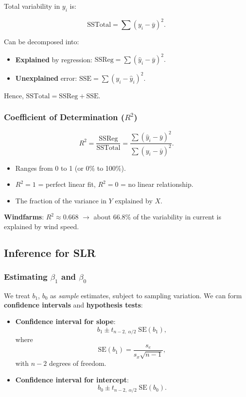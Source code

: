 \documentclass[10pt]{extarticle}
\begin{document}
Total variability in $y_i$ is:

\[
    \text{SSTotal} = \sum (y_i - \bar{y})^2.
\]

Can be decomposed into:
\begin{itemize}
    \item \textbf{Explained} by regression: $\text{SSReg} = \sum (\hat{y}_i - \bar{y})^2.$
    \item \textbf{Unexplained} error: $\text{SSE} = \sum (y_i - \hat{y}_i)^2.$
\end{itemize}

Hence, $\text{SSTotal} = \text{SSReg} + \text{SSE}.$

\subsubsection{Coefficient of Determination ($R^2$)}

\[
    R^2 = \frac{\text{SSReg}}{\text{SSTotal}} = \frac{\sum (\hat{y}_i - \bar{y})^2}{\sum (y_i - \bar{y})^2}.
\]

\begin{itemize}
    \item Ranges from 0 to 1 (or 0\% to 100\%).
    \item $R^2=1$ = perfect linear fit, $R^2=0$ = no linear relationship.
    \item The fraction of the variance in $Y$ explained by $X$.
\end{itemize}

\textbf{Windfarms}: $R^2 \approx 0.668$ $\rightarrow$ about 66.8\% of the variability in current is explained by wind speed.



\subsection{Inference for SLR}

\subsubsection{Estimating $\beta_1$ and $\beta_0$}

We treat $b_1$, $b_0$ as \emph{sample} estimates, subject to sampling variation. We can form \textbf{confidence intervals} and \textbf{hypothesis tests}:
\begin{itemize}
    \item \textbf{Confidence interval for slope}:
          \[
              b_1 \pm t_{n-2,\;\alpha/2}\; \text{SE}(b_1),
          \]
          where
          \[
              \text{SE}(b_1) = \frac{s_e}{s_x\sqrt{n-1}},
          \]
          with $n-2$ degrees of freedom.
    \item \textbf{Confidence interval for intercept}:
          \[
              b_0 \pm t_{n-2,\;\alpha/2}\; \text{SE}(b_0).
          \]
\end{itemize}
\end{document}
